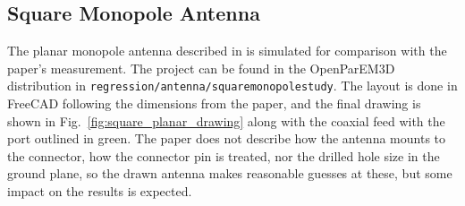 \documentclass[titlepage]{article}
\renewcommand\_{\textunderscore\linebreak[1]}
\begin{document}
\subsection{Square Monopole Antenna}

The planar monopole antenna described in \cite{Wong} is simulated for comparison with the paper's measurement.  The project can be found in the OpenParEM3D distribution in \texttt{regression/antenna/square\_monopole\_study}.  The layout is done in FreeCAD following the dimensions from the paper, and the final drawing is shown in Fig.~\ref{fig:square_planar_drawing} along with the coaxial feed with the port outlined in green.  The paper does not describe how the antenna mounts to the connector, how the connector pin is treated, nor the drilled hole size in the ground plane, so the drawn antenna makes reasonable guesses at these, but some impact on the results is expected.
\end{document}
